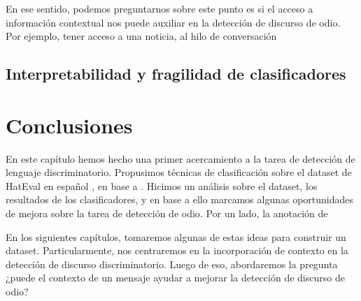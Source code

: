 En ese sentido, podemos preguntarnos sobre este punto es si el acceso a información contextual nos puede auxiliar en la detección de discurso de odio. Por ejemplo, tener acceso a una noticia, al hilo de conversación


\subsection{Interpretabilidad y fragilidad de clasificadores}



\section{Conclusiones}

En este capítulo hemos hecho una primer acercamiento a la tarea de detección de lenguaje discriminatorio. Propusimos técnicas de clasificación sobre el dataset de HatEval en español \cite{hateval2019semeval}, en base a \citet{atalaya_tass2018}. Hicimos un análisis sobre el dataset, los resultados de los clasificadores, y en base a ello marcamos algunas oportunidades de mejora sobre la tarea de detección de odio. Por un lado, la anotación de

En los siguientes capítulos, tomaremos algunas de estas ideas para construir un dataset. Particularmente, nos centraremos en la incorporación de contexto en la detección de discurso discriminatorio. Luego de eso, abordaremos la pregunta ¿puede el contexto de un mensaje ayudar a mejorar la detección de discurso de odio?
